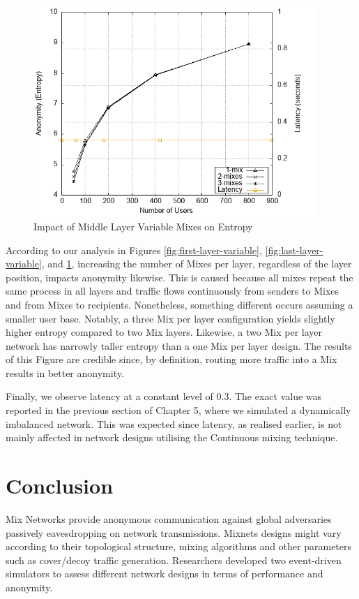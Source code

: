 \documentclass[logo,msc,cyber]{infthesis}   %
\begin{document}
\begin{figure}[h!]
    \centering
    \includegraphics[height=8cm]{figures/simulator_extentions/middle_layer_variable.png}
    \caption{Impact of Middle Layer Variable Mixes on Entropy}
    \label{fig:middle-layer-variable}
\end{figure} 

According to our analysis in Figures \ref{fig:first-layer-variable},
\ref{fig:last-layer-variable}, and \ref{fig:middle-layer-variable},  increasing
the number of Mixes per layer, regardless of the layer position, impacts anonymity
likewise. This is caused because all mixes repeat the same process in all layers
and traffic flows continuously from senders to Mixes and from Mixes to
recipients. Nonetheless, something different occurs assuming a smaller user
base. Notably, a three Mix per layer configuration yields slightly higher entropy
compared to two Mix layers. Likewise, a two Mix per layer network has narrowly
taller entropy than a one Mix per layer design. The results of this Figure are
credible since, by definition, routing more traffic into a Mix results in better
anonymity.

Finally, we observe latency at a constant level of 0.3. The exact value was
reported in the previous section of Chapter 5, where we simulated a dynamically
imbalanced network. This was expected since latency, as realised earlier, is not
mainly affected in network designs utilising the Continuous mixing technique. 

\chapter{Conclusion}

Mix Networks provide anonymous communication against global adversaries
passively eavesdropping on network transmissions. Mixnets designs might vary
according to their topological structure, mixing algorithms and other parameters
such as cover/decoy traffic generation. Researchers developed two event-driven
simulators to assess different network designs in terms of performance and
anonymity.
\end{document}

